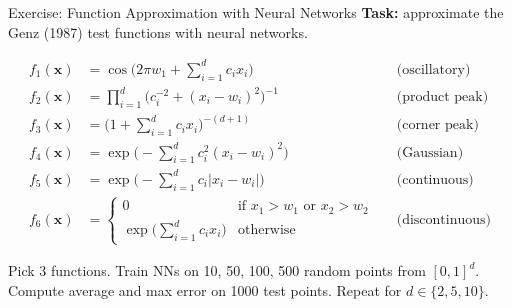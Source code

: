\documentclass[aspectratio=169,11pt]{beamer}
\newcommand{\x}{\bm{x}}
\begin{document}
\begin{frame}[shrink=12]{Exercise: Function Approximation with Neural Networks}
\textbf{Task:} approximate the Genz (1987) test functions with neural networks.

\vspace{0.2cm}
\begin{footnotesize}
\begin{align*}
    f_1(\x) &= \cos\!\Big(2\pi w_1 + \textstyle\sum_{i=1}^{d} c_i x_i\Big) & &\text{(oscillatory)} \\
    f_2(\x) &= \textstyle\prod_{i=1}^{d} \big(c_i^{-2} + (x_i - w_i)^2\big)^{-1} & &\text{(product peak)} \\
    f_3(\x) &= \Big(1 + \textstyle\sum_{i=1}^{d} c_i x_i\Big)^{-(d+1)} & &\text{(corner peak)} \\
    f_4(\x) &= \exp\!\Big(-\textstyle\sum_{i=1}^{d} c_i^2(x_i - w_i)^2\Big) & &\text{(Gaussian)} \\
    f_5(\x) &= \exp\!\Big(-\textstyle\sum_{i=1}^{d} c_i|x_i - w_i|\Big) & &\text{(continuous)} \\
    f_6(\x) &= \begin{cases}0 & \text{if } x_1>w_1 \text{ or } x_2>w_2\\ \exp\!\big(\textstyle\sum_{i=1}^{d}c_i x_i\big) & \text{otherwise}\end{cases} & &\text{(discontinuous)}
\end{align*}
\end{footnotesize}

\vspace{0.1cm}
{\small Pick 3 functions. Train NNs on 10, 50, 100, 500 random points from $[0,1]^d$.  Compute average and max error on 1000 test points.  Repeat for $d\in\{2,5,10\}$.}
\end{frame}
\end{document}
